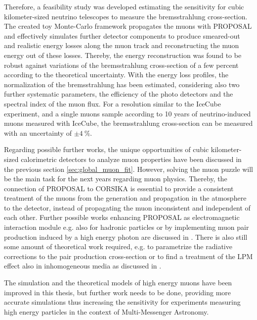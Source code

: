 Therefore, a feasibility study was developed estimating the sensitivity for cubic kilometer-sized neutrino telescopes to measure the bremsstrahlung cross-section.
The created toy Monte-Carlo framework propagates the muons with PROPOSAL and effectively simulates further detector components to produce smeared-out and realistic energy losses along the muon track and reconstructing the muon energy out of these losses.
Thereby, the energy reconstruction was found to be robust against variations of the bremsstrahlung cross-section of a few percent according to the theoretical uncertainty.
With the energy loss profiles, the normalization of the bremsstrahlung has been estimated, considering also two further systematic parameters, the efficiency of the photo detectors and the spectral index of the muon flux.
For a resolution similar to the IceCube experiment, and a single muons sample according to  10 years of neutrino-induced muons measured with IceCube, the bremsstrahlung cross-section can be measured with an uncertainty of $\pm \SI{4}{\%}$.

Regarding possible further works, the unique opportunities of cubic kilometer-sized calorimetric detectors to analyze muon properties have been discussed in the previous section \ref{sec:global_muon_fit}.
However, solving the muon puzzle will be the main task for the next years regarding muon physics.
Thereby, the connection of PROPOSAL to CORSIKA is essential to provide a consistent treatment of the muons from the generation and propagation in the atmosphere to the detector, instead of propagating the muon inconsistent and independent of each other.
Further possible works enhancing PROPOSAL as electromagnetic interaction module e.g. also for hadronic particles or by implementing muon pair production induced by a high energy photon are discussed in .
There is also still some amount of theoretical work required, e.g. to parametrize the radiative corrections to the pair production cross-section or to find a treatment of the LPM effect also in inhomogeneous media as discussed in .

The simulation and the theoretical models of high energy muons have been improved in this thesis, but further work needs to be done, providing more accurate simulations thus increasing the sensitivity for experiments measuring high energy particles in the context of Multi-Messenger Astronomy.

